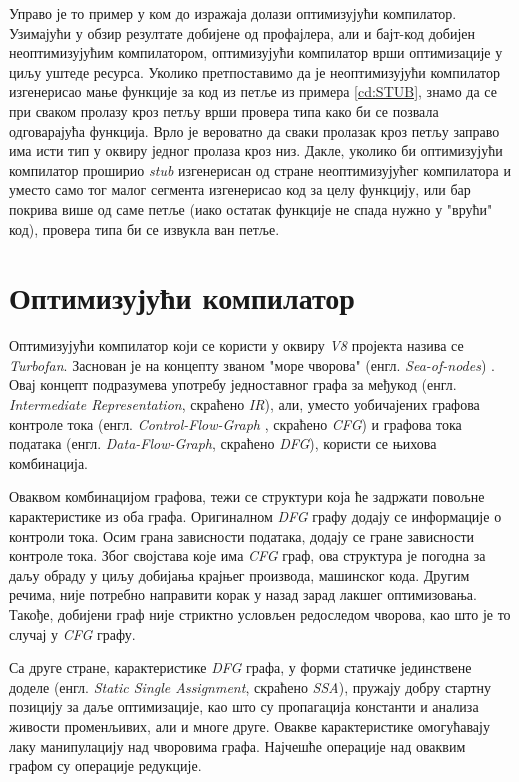 \documentclass[12pt,oneside]{memoir}
\begin{document}
Управо је то пример у ком до изражаја долази оптимизујући компилатор. Узимајући у обзир резултате добијене од профајлера, али и бајт-код добијен неоптимизујућим компилатором,
оптимизујући компилатор врши оптимизације у циљу уштеде ресурса. Уколико претпоставимо да је неоптимизујући компилатор изгенерисао мање функције за код из петље из примера \ref{cd:STUB},
знамо да се при сваком пролазу кроз петљу врши провера типа како би се позвала одговарајућа функција. Врло је вероватно да сваки пролазак кроз петљу заправо
има исти тип у оквиру једног пролаза кроз низ. Дакле, уколико би оптимизујући компилатор проширио \textit{stub} изгенерисан од стране неоптимизујућег компилатора
и уместо само тог малог сегмента изгенерисао код за целу функцију, или бар покрива више од саме петље (иако остатак функције не спада нужно у "врући" код),
провера типа би се извукла ван петље.

\section{Оптимизујући компилатор} \label{chp:OPT}

Оптимизујући компилатор који се користи у оквиру \textit{V8} пројекта назива се \textit{Turbofan}. Заснован је на концепту званом "море чворова" (енгл. \textit{Sea-of-nodes}) \cite{SON}.
Овај концепт подразумева употребу једноставног графа за међукод (енгл. \textit{Intermediate Representation}, скраћено \textit{IR}), али, уместо уобичајених графова контроле тока (енгл. \textit{Control-Flow-Graph}
, скраћено \textit{CFG}) и графова тока података (енгл. \textit{Data-Flow-Graph}, скраћено \textit{DFG}), користи се њихова комбинација.

Оваквом комбинацијом графова, тежи се структури која ће задржати повољне карактеристике из оба графа. Оригиналном \textit{DFG} графу додају се информације о контроли тока.
Осим грана зависности података, додају се гране зависности контроле тока. Због својстава које има \textit{CFG} граф, ова структура је погодна за даљу обраду у
циљу добијања крајњег производа, машинског кода. Другим речима, није потребно направити корак у назад зарад лакшег оптимизовања. Такође, добијени граф није стриктно условљен
редоследом чворова, као што је то случај у \textit{CFG} графу.

Са друге стране, карактеристике \textit{DFG} графа, у форми статичке јединствене доделе (енгл. \textit{Static Single Assignment}, скраћено \textit{SSA}), пружају добру стартну позицију
за даље оптимизације, као што су пропагација константи и анализа живости променљивих, али и многе друге. Овакве карактеристике омогућавају лаку манипулацију над чворовима графа.
Најчешће операције над оваквим графом су операције редукције.
\end{document}
